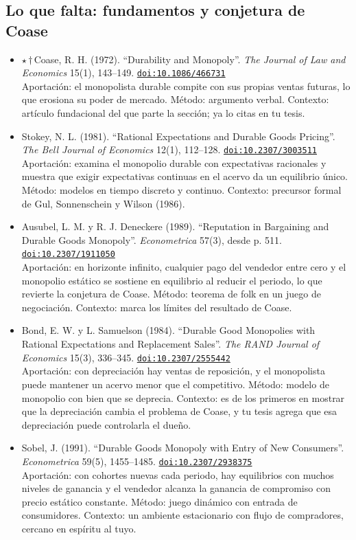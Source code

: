 \documentclass[11pt]{article}
\begin{document}
\subsection*{Lo que falta: fundamentos y conjetura de Coase}
\begin{itemize}
\item $\star$\,$\dagger$\,Coase, R. H. (1972). ``Durability and Monopoly''. \textit{The Journal of Law and Economics} 15(1), 143--149. \href{https://doi.org/10.1086/466731}{\texttt{doi:10.1086/466731}}\\
Aportación: el monopolista durable compite con sus propias ventas futuras, lo que erosiona su poder de mercado. Método: argumento verbal. Contexto: artículo fundacional del que parte la sección; ya lo citas en tu tesis.
\item Stokey, N. L. (1981). ``Rational Expectations and Durable Goods Pricing''. \textit{The Bell Journal of Economics} 12(1), 112--128. \href{https://doi.org/10.2307/3003511}{\texttt{doi:10.2307/3003511}}\\
Aportación: examina el monopolio durable con expectativas racionales y muestra que exigir expectativas continuas en el acervo da un equilibrio único. Método: modelos en tiempo discreto y continuo. Contexto: precursor formal de Gul, Sonnenschein y Wilson (1986).
\item Ausubel, L. M. y R. J. Deneckere (1989). ``Reputation in Bargaining and Durable Goods Monopoly''. \textit{Econometrica} 57(3), desde p. 511. \href{https://doi.org/10.2307/1911050}{\texttt{doi:10.2307/1911050}}\\
Aportación: en horizonte infinito, cualquier pago del vendedor entre cero y el monopolio estático se sostiene en equilibrio al reducir el periodo, lo que revierte la conjetura de Coase. Método: teorema de folk en un juego de negociación. Contexto: marca los límites del resultado de Coase.
\item Bond, E. W. y L. Samuelson (1984). ``Durable Good Monopolies with Rational Expectations and Replacement Sales''. \textit{The RAND Journal of Economics} 15(3), 336--345. \href{https://doi.org/10.2307/2555442}{\texttt{doi:10.2307/2555442}}\\
Aportación: con depreciación hay ventas de reposición, y el monopolista puede mantener un acervo menor que el competitivo. Método: modelo de monopolio con bien que se deprecia. Contexto: es de los primeros en mostrar que la depreciación cambia el problema de Coase, y tu tesis agrega que esa depreciación puede controlarla el dueño.
\item Sobel, J. (1991). ``Durable Goods Monopoly with Entry of New Consumers''. \textit{Econometrica} 59(5), 1455--1485. \href{https://doi.org/10.2307/2938375}{\texttt{doi:10.2307/2938375}}\\
Aportación: con cohortes nuevas cada periodo, hay equilibrios con muchos niveles de ganancia y el vendedor alcanza la ganancia de compromiso con precio estático constante. Método: juego dinámico con entrada de consumidores. Contexto: un ambiente estacionario con flujo de compradores, cercano en espíritu al tuyo.
\end{itemize}
\end{document}
